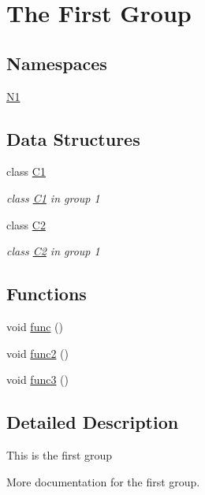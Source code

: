 \hypertarget{group__group1}{}\section{The First Group}
\label{group__group1}
\subsection*{Namespaces}
\begin{DoxyCompactItemize}
\item 
 \hyperlink{namespace_n1}{N1}
\end{DoxyCompactItemize}
\subsection*{Data Structures}
\begin{DoxyCompactItemize}
\item 
class \hyperlink{class_c1}{C1}
\begin{DoxyCompactList}\small\item\em class \hyperlink{class_c1}{C1} in group 1 \end{DoxyCompactList}\item 
class \hyperlink{class_c2}{C2}
\begin{DoxyCompactList}\small\item\em class \hyperlink{class_c2}{C2} in group 1 \end{DoxyCompactList}\end{DoxyCompactItemize}
\subsection*{Functions}
\begin{DoxyCompactItemize}
\item 
void \hyperlink{group__group1_ga24f647174760cac13d2624b5ad74b00c}{func} ()
\item 
void \hyperlink{group__group1_ga053929c0809a5f56f7548fd7d9968f31}{func2} ()
\item 
void \hyperlink{group__group1_gadbf675591ff057ec48ce35b0d5cdf755}{func3} ()
\end{DoxyCompactItemize}


\subsection{Detailed Description}
This is the first group

More documentation for the first group. 

